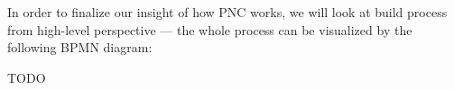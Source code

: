 \documentclass[../main.tex]{subfiles}
\begin{document}
In order to finalize our insight of how PNC works, we will look at build process from high-level perspective — the whole process can be visualized by the following BPMN diagram:

TODO
\end{document}
